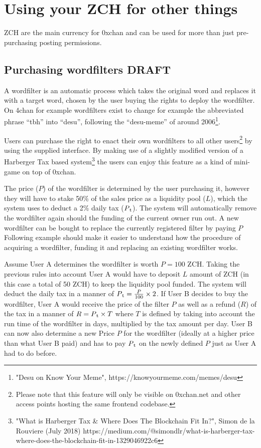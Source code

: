 \documentclass[a4paper]{article}
\newcommand{\projectname}{0xchan}
\begin{document}
\section{Using your ZCH for other things}
ZCH are the main currency for \projectname{} and can be used for more than just pre-purchasing posting permissions.

\subsection{Purchasing wordfilters DRAFT}
A wordfilter is an automatic process which takes the original word and replaces it with a target word, chosen by the user buying the rights to deploy the wordfilter. On 4chan for example wordfilters exist to change for example the abbreviated phrase ``tbh'' into ``desu'', following the ``desu-meme'' of around 2006\footnote{"Desu on Know Your Meme", https://knowyourmeme.com/memes/desu}.

Users can purchase the right to enact their own wordfilters to all other users\footnote{Please note that this feature will only be visible on 0xchan.net and other access points hosting the same frontend codebase.} by using the supplied interface. By making use of a slightly modified version of a Harberger Tax based system\footnote{"What is Harberger Tax \& Where Does The Blockchain Fit In?", Simon de la Rouviere (July 2018) https://medium.com/@simondlr/what-is-harberger-tax-where-does-the-blockchain-fit-in-1329046922c6} the users can enjoy this feature as a kind of mini-game on top of \projectname{}.

The price ($P$) of the wordfilter is determined by the user purchasing it, however they will have to stake 50\% of the sales price as a liquidity pool ($L$), which the system uses to deduct a 2\% daily tax ($P\textsubscript{t}$). The system will automatically remove the wordfilter again should the funding of the current owner run out. A new wordfilter can be bought to replace the currently registered filter by paying $P$ Following example should make it easier to understand how the procedure of acquiring a wordfilter, funding it and replacing an existing wordfilter works.

Assume User A determines the wordfilter is worth $P=100$ ZCH. Taking the previous rules into account User A would have to deposit $L$ amount of ZCH (in this case a total of 50 ZCH) to keep the liquidity pool funded. The system will deduct the daily tax in a manner of $P\textsubscript{t}=\frac{P}{100} \times 2$. If User B decides to buy the wordfilter, User A would receive the price of the filter $P$ as well as a refund ($R$) of the tax in a manner of $R=P\textsubscript{t} \times T$ where $T$ is defined by taking into account the run time of the wordfilter in days, multiplied by the tax amount per day. User B can now also determine a new Price $P$ for the wordfilter (ideally at a higher price than what User B paid) and has to pay $P\textsubscript{t}$ on the newly defined $P$ just as User A had to do before.
\end{document}
